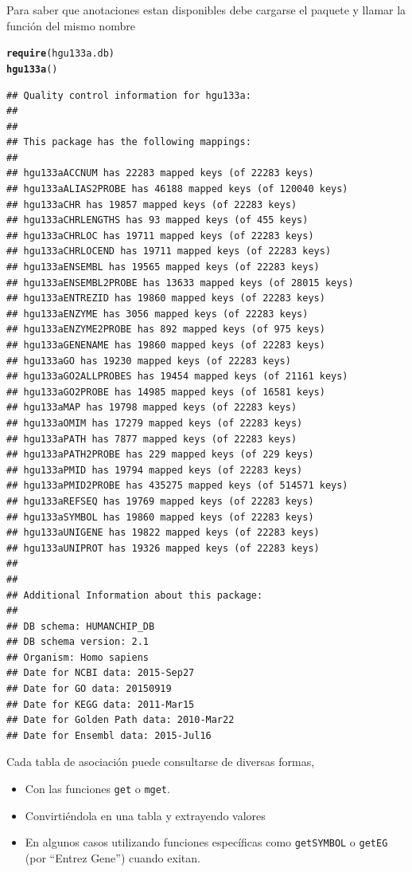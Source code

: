 \documentclass[a4paper]{article}\usepackage[]{graphicx}\usepackage[]{color}
\makeatletter
\newcommand{\hlstd}[1]{\textcolor[rgb]{0.345,0.345,0.345}{#1}}%
\newcommand{\hlkwd}[1]{\textcolor[rgb]{0.737,0.353,0.396}{\textbf{#1}}}%
\newenvironment{kframe}{%
 \def\at@end@of@kframe{}%
 \ifinner\ifhmode%
  \def\at@end@of@kframe{\end{minipage}}%
  \begin{minipage}{\columnwidth}%
 \fi\fi%
 \def\FrameCommand##1{\hskip\@totalleftmargin \hskip-\fboxsep
 \colorbox{shadecolor}{##1}\hskip-\fboxsep
     \hskip-\linewidth \hskip-\@totalleftmargin \hskip\columnwidth}%
 \MakeFramed {\advance\hsize-\width
   \@totalleftmargin\z@ \linewidth\hsize
   \@setminipage}}%
 {\par\unskip\endMakeFramed%
 \at@end@of@kframe}
\newenvironment{knitrout}{}{} %
\makeatother
\begin{document}
Para saber que anotaciones estan disponibles debe cargarse el paquete y llamar la función del mismo nombre 

\begin{knitrout}
\color{fgcolor}\begin{kframe}
\begin{alltt}
\hlkwd{require}\hlstd{(hgu133a.db)}
\hlkwd{hgu133a}\hlstd{()}
\end{alltt}
\begin{verbatim}
## Quality control information for hgu133a:
## 
## 
## This package has the following mappings:
## 
## hgu133aACCNUM has 22283 mapped keys (of 22283 keys)
## hgu133aALIAS2PROBE has 46188 mapped keys (of 120040 keys)
## hgu133aCHR has 19857 mapped keys (of 22283 keys)
## hgu133aCHRLENGTHS has 93 mapped keys (of 455 keys)
## hgu133aCHRLOC has 19711 mapped keys (of 22283 keys)
## hgu133aCHRLOCEND has 19711 mapped keys (of 22283 keys)
## hgu133aENSEMBL has 19565 mapped keys (of 22283 keys)
## hgu133aENSEMBL2PROBE has 13633 mapped keys (of 28015 keys)
## hgu133aENTREZID has 19860 mapped keys (of 22283 keys)
## hgu133aENZYME has 3056 mapped keys (of 22283 keys)
## hgu133aENZYME2PROBE has 892 mapped keys (of 975 keys)
## hgu133aGENENAME has 19860 mapped keys (of 22283 keys)
## hgu133aGO has 19230 mapped keys (of 22283 keys)
## hgu133aGO2ALLPROBES has 19454 mapped keys (of 21161 keys)
## hgu133aGO2PROBE has 14985 mapped keys (of 16581 keys)
## hgu133aMAP has 19798 mapped keys (of 22283 keys)
## hgu133aOMIM has 17279 mapped keys (of 22283 keys)
## hgu133aPATH has 7877 mapped keys (of 22283 keys)
## hgu133aPATH2PROBE has 229 mapped keys (of 229 keys)
## hgu133aPMID has 19794 mapped keys (of 22283 keys)
## hgu133aPMID2PROBE has 435275 mapped keys (of 514571 keys)
## hgu133aREFSEQ has 19769 mapped keys (of 22283 keys)
## hgu133aSYMBOL has 19860 mapped keys (of 22283 keys)
## hgu133aUNIGENE has 19822 mapped keys (of 22283 keys)
## hgu133aUNIPROT has 19326 mapped keys (of 22283 keys)
## 
## 
## Additional Information about this package:
## 
## DB schema: HUMANCHIP_DB
## DB schema version: 2.1
## Organism: Homo sapiens
## Date for NCBI data: 2015-Sep27
## Date for GO data: 20150919
## Date for KEGG data: 2011-Mar15
## Date for Golden Path data: 2010-Mar22
## Date for Ensembl data: 2015-Jul16
\end{verbatim}
\end{kframe}
\end{knitrout}

Cada tabla de asociación puede consultarse de diversas formas, 
\begin{itemize}
\item Con las funciones \texttt{get} o \texttt{mget}.
\item Convirtiéndola en una tabla y extrayendo valores
\item En algunos casos utilizando funciones específicas como \texttt{getSYMBOL} o \texttt{getEG} (por ``Entrez Gene'') cuando exitan.
\end{itemize}
\end{document}
